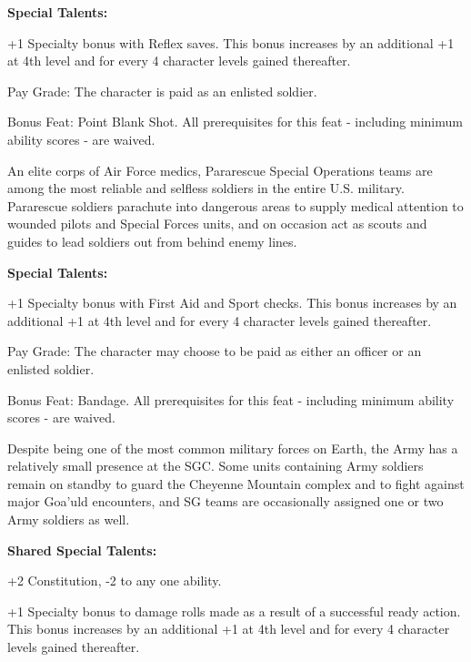 \textbf{Special Talents:}
\begin{itemize*}
\item +1 Specialty bonus with Reflex saves. This bonus increases by an additional +1 at 4th level and for every 4 character levels gained thereafter.
\item Pay Grade: The character is paid as an enlisted soldier.
\item Bonus Feat: Point Blank Shot. All prerequisites for this feat - including minimum ability scores - are waived.
\end{itemize*}

An elite corps of Air Force medics, Pararescue Special Operations teams are among the most reliable and selfless soldiers in the entire U.S. military. Pararescue soldiers parachute into dangerous areas to supply medical attention to wounded pilots and Special Forces units, and on occasion act as scouts and guides to lead soldiers out from behind enemy lines.

\textbf{Special Talents:}
\begin{itemize*}
\item +1 Specialty bonus with First Aid and Sport checks. This bonus increases by an additional +1 at 4th level and for every 4 character levels gained thereafter.
\item Pay Grade: The character may choose to be paid as either an officer or an enlisted soldier.
\item Bonus Feat: Bandage. All prerequisites for this feat - including minimum ability scores - are waived.
\end{itemize*}

Despite being one of the most common military forces on Earth, the Army has a relatively small presence at the SGC. Some units containing Army soldiers remain on standby to guard the Cheyenne Mountain complex and to fight against major Goa'uld encounters, and SG teams are occasionally assigned one or two Army soldiers as well.

\textbf{Shared Special Talents:}
\begin{itemize*}
\item +2 Constitution, -2 to any one ability.
\item +1 Specialty bonus to damage rolls made as a result of a successful ready action. This bonus increases by an additional +1 at 4th level and for every 4 character levels gained thereafter.
\end{itemize*}

